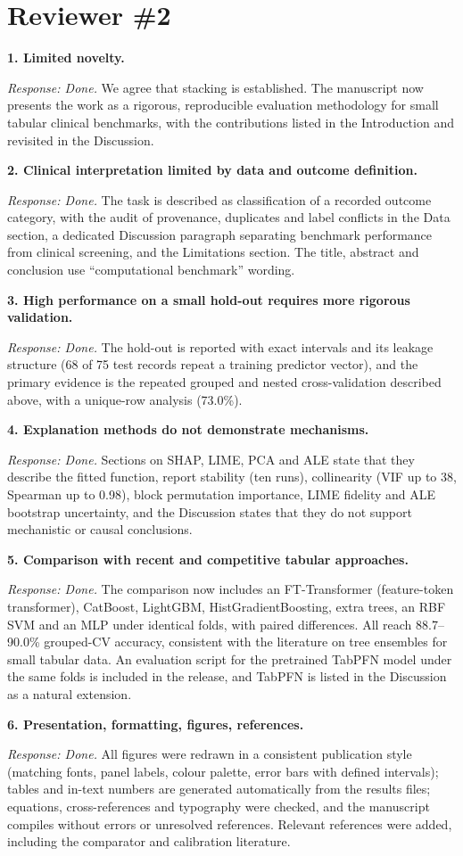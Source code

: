 \documentclass[11pt,a4paper]{article}
\newcommand{\rc}[2]{\par\medskip\noindent\textbf{#1}\par\noindent\textit{Response: Done.} #2\par}
\begin{document}
\section*{Reviewer \#2}
\rc{1. Limited novelty.}{We agree that stacking is established. The manuscript now presents the work as a rigorous, reproducible evaluation methodology for small tabular clinical benchmarks, with the contributions listed in the Introduction and revisited in the Discussion.}
\rc{2. Clinical interpretation limited by data and outcome definition.}{The task is described as classification of a recorded outcome category, with the audit of provenance, duplicates and label conflicts in the Data section, a dedicated Discussion paragraph separating benchmark performance from clinical screening, and the Limitations section. The title, abstract and conclusion use ``computational benchmark'' wording.}
\rc{3. High performance on a small hold-out requires more rigorous validation.}{The hold-out is reported with exact intervals and its leakage structure (68 of 75 test records repeat a training predictor vector), and the primary evidence is the repeated grouped and nested cross-validation described above, with a unique-row analysis (73.0\%).}
\rc{4. Explanation methods do not demonstrate mechanisms.}{Sections on SHAP, LIME, PCA and ALE state that they describe the fitted function, report stability (ten runs), collinearity (VIF up to 38, Spearman up to 0.98), block permutation importance, LIME fidelity and ALE bootstrap uncertainty, and the Discussion states that they do not support mechanistic or causal conclusions.}
\rc{5. Comparison with recent and competitive tabular approaches.}{The comparison now includes an FT-Transformer (feature-token transformer), CatBoost, LightGBM, HistGradientBoosting, extra trees, an RBF SVM and an MLP under identical folds, with paired differences. All reach 88.7--90.0\% grouped-CV accuracy, consistent with the literature on tree ensembles for small tabular data. An evaluation script for the pretrained TabPFN model under the same folds is included in the release, and TabPFN is listed in the Discussion as a natural extension.}
\rc{6. Presentation, formatting, figures, references.}{All figures were redrawn in a consistent publication style (matching fonts, panel labels, colour palette, error bars with defined intervals); tables and in-text numbers are generated automatically from the results files; equations, cross-references and typography were checked, and the manuscript compiles without errors or unresolved references. Relevant references were added, including the comparator and calibration literature.}
\end{document}
